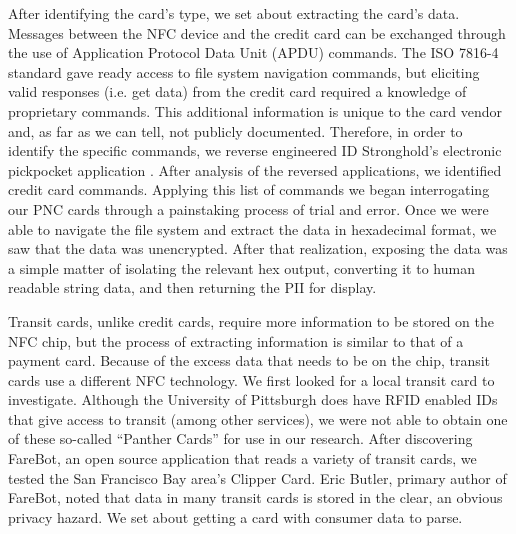 \documentclass{sig-alternate}
\begin{document}
After identifying the card's type, we set about extracting the card's data. Messages between the NFC device and the credit card can be exchanged through the use of Application Protocol Data Unit (APDU) commands. The ISO 7816-4 standard gave ready access to file system navigation commands, but eliciting valid responses (i.e. get data) from the credit card required a knowledge of proprietary commands. This additional information is unique to the card vendor and, as far as we can tell, not publicly documented. Therefore, in order to identify the specific commands, we reverse engineered ID Stronghold's electronic pickpocket application \cite{idstronghold-1}. After analysis of the reversed applications, we identified credit card commands.  Applying this list of commands we began interrogating our PNC cards through a painstaking process of trial and error.  Once we were able to navigate the file system and extract the data in hexadecimal format, we saw that the data was unencrypted.  After that realization, exposing the data was a simple matter of isolating the relevant hex output, converting it to human readable string data, and then returning the PII for display.     

Transit cards, unlike credit cards, require more information to be stored on the NFC chip, but the process of extracting information is similar to that of a payment card.  Because of the excess data that needs to be on the chip, transit cards use a different NFC technology.  We first looked for a local transit card to investigate.  Although the University of Pittsburgh does have RFID enabled IDs that give access to transit (among other services), \cite{pittcard-1} we were not able to obtain one of these so-called ``Panther Cards'' for use in our research.  After discovering FareBot, an open source application \cite{farebot-1} that reads a variety of transit cards, we tested the San Francisco Bay area's Clipper Card.  Eric Butler, primary author of FareBot, noted that data in many transit cards is stored in the clear, an obvious privacy hazard.  We set about getting a card with consumer data to parse.  
\end{document}
